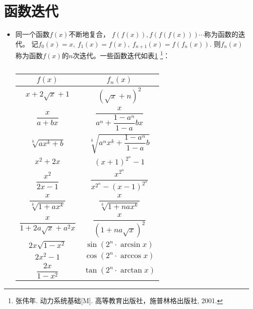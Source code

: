 \begin{itemize}[leftmargin=\inteval{\myitemleftmargin}pt,itemsep=
   \inteval{\myitemitempsep}pt,topsep=\inteval{\myitemtopsep}pt]

\end{itemize}

\section{函数迭代}
\begin{itemize}[leftmargin=\inteval{\myitemleftmargin}pt,itemsep=
   \inteval{\myitemitempsep}pt,topsep=\inteval{\myitemtopsep}pt]
\item 同一个函数$ f(x) $不断地复合，
$ f(f(x)),f(f(f(x))) \cdots $称为函数的迭代。
记$ f_0(x)=x,\ f_1(x)=f(x),\ f_{n+1}(x)=f(f_n(x)) $. 
则$ f_n(x) $称为函数$ f(x) $的$ n $次迭代。一些函数迭代如表\ref{函数迭代列表}
\footnote{张伟年. 动力系统基础[M]. 高等教育出版社，施普林格出版社, 2001.}：
\begin{table}[h] 
\centering
\renewcommand\arraystretch{1.5}  
\caption{}   
\begin{tabular}{|c|c|} 
    \hline
    $ f(x) $ & $ f_n(x) $ \\
    \hline
    $ x+2\sqrt{x}+1 $ & $ (\sqrt{x}+n)^2 $ \\
    \hline
    $ \dfrac{x}{a+bx} $ & $ \dfrac{x}{a^n+\dfrac{1-a^n}{1-a}bx} $ \\
    \hline
    $ \sqrt[k]{ax^k+b} $ & $ \sqrt[k]{a^nx^k+\dfrac{1-a^n}{1-a}b} $ \\
    \hline
    $ x^2+2x $ & $ (x+1)^{2^n}-1 $ \\
    \hline
    $ \dfrac{x^2}{2x-1} $ & $\dfrac{x^{2^n}}{x^{2^n}-(x-1)^{2^n}}$ \\
    \hline
    $ \dfrac{x}{\sqrt[k]{1+ax^k}} $ & $ \dfrac{x}{\sqrt[k]{1+nax^k}}  $ \\
    \hline
    $ \dfrac{x}{1+2a\sqrt{x}+a^2x} $ & $ \dfrac{x}{(1+na\sqrt{x})^2} $ \\
    \hline
    $ 2x\sqrt{1-x^2} $ & $ \sin(2^n\cdot \arcsin x) $ \\
    \hline
    $ 2x^2-1 $ & $ \cos(2^n\cdot \arccos x) $ \\
    \hline
    $ \dfrac{2x}{1-x^2} $ & $ \tan(2^n\cdot \arctan x) $ \\
    \hline
\end{tabular}
\label{函数迭代列表}
\end{table} 


\end{itemize}
